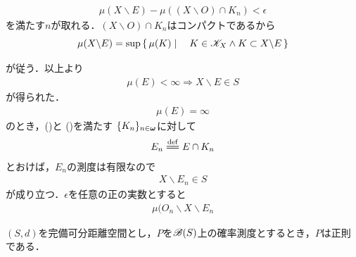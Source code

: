 \begin{sketch}
\begin{description}
					\begin{align}
						\mu(X \backslash E) - \mu((X \backslash O) \cap K_n) < \epsilon
					\end{align}
					を満たす$n$が取れる．$(X \backslash O) \cap K_n$はコンパクトであるから
					\begin{align}
						\mu(X \backslash E) = \operatorname*{sup}_{} \left\{\, \mu(K) \mid \quad K \in \mathscr{K}_X \wedge K \subset X \backslash E\, \right\}
					\end{align}
					が従う．以上より
					\begin{align}
						\mu(E) < \infty \Longrightarrow X \backslash E \in S
					\end{align}
					が得られた．
					\begin{align}
						\mu(E) = \infty
					\end{align}
					のとき，()と
					()を満たす
					$\{K_n\}_{n \in {\boldsymbol \omega}}$に対して
					\begin{align}
						E_n \defeq E \cap K_n
					\end{align}
					とおけば，$E_n$の測度は有限なので
					\begin{align}
						X \backslash E_n \in S
					\end{align}
					が成り立つ．$\epsilon$を任意の正の実数とすると
					\begin{align}
						\mu(O_n \backslash X \backslash E_n
					\end{align}
			\end{description}
		\end{sketch}
		
		\begin{screen}
			\begin{thm}[正則正値測度空間のLebesgue拡大も正則正値測度空間]
				
			\end{thm}
		\end{screen}
		
		\begin{screen}
			\begin{thm}[完備可分距離空間上のBorel確率測度は正則]
				$(S,d)$を完備可分距離空間とし，$P$を$\mathscr{B}(S)$上の確率測度とするとき，$P$は正則である．
			\end{thm}
		\end{screen}
	
